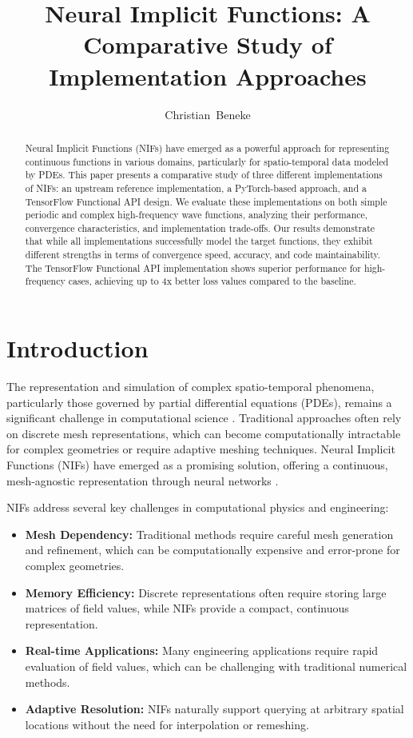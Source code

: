 \documentclass[10pt,journal,compsoc]{IEEEtran}
\begin{document}
\title{Neural Implicit Functions: A Comparative Study of Implementation Approaches}

\author{Christian~Beneke}

\maketitle

\begin{abstract}
Neural Implicit Functions (NIFs) have emerged as a powerful approach for representing continuous functions in various domains, particularly for spatio-temporal data modeled by PDEs. This paper presents a comparative study of three different implementations of NIFs: an upstream reference implementation, a PyTorch-based approach, and a TensorFlow Functional API design. We evaluate these implementations on both simple periodic and complex high-frequency wave functions, analyzing their performance, convergence characteristics, and implementation trade-offs. Our results demonstrate that while all implementations successfully model the target functions, they exhibit different strengths in terms of convergence speed, accuracy, and code maintainability. The TensorFlow Functional API implementation shows superior performance for high-frequency cases, achieving up to 4x better loss values compared to the baseline.
\end{abstract}

\section{Introduction}
The representation and simulation of complex spatio-temporal phenomena, particularly those governed by partial differential equations (PDEs), remains a significant challenge in computational science \cite{neural_fields2022}. Traditional approaches often rely on discrete mesh representations, which can become computationally intractable for complex geometries or require adaptive meshing techniques. Neural Implicit Functions (NIFs) have emerged as a promising solution, offering a continuous, mesh-agnostic representation through neural networks \cite{nif2023}.

NIFs address several key challenges in computational physics and engineering:
\begin{itemize}
    \item \textbf{Mesh Dependency:} Traditional methods require careful mesh generation and refinement, which can be computationally expensive and error-prone for complex geometries.
    \item \textbf{Memory Efficiency:} Discrete representations often require storing large matrices of field values, while NIFs provide a compact, continuous representation.
    \item \textbf{Real-time Applications:} Many engineering applications require rapid evaluation of field values, which can be challenging with traditional numerical methods.
    \item \textbf{Adaptive Resolution:} NIFs naturally support querying at arbitrary spatial locations without the need for interpolation or remeshing.
\end{itemize}
\end{document}
